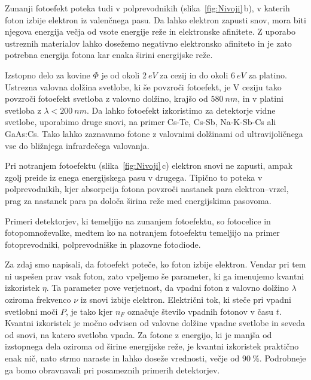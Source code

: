Zunanji fotoefekt poteka tudi v polprevodnikih (slika~\ref{fig:Nivoji}\,b),
v katerih foton izbije elektron iz valenčnega pasu. Da lahko elektron zapusti snov,
mora biti njegova energija večja od vsote energije reže in elektronske afinitete.
Z uporabo ustreznih materialov lahko dosežemo negativno elektronsko afiniteto
in je zato potrebna energija fotona kar enaka širini energijske reže.

Izstopno delo za kovine $\Phi$ je od okoli $2~\si{eV}$ za cezij in do okoli 
$6~\si{eV}$ za platino. 
Ustrezna valovna dolžina svetlobe, ki še povzroči fotoefekt, je 
V ceziju tako povzroči fotoefekt svetloba z valovno dolžino, krajšo od $580~\si{nm}$, in
v platini svetloba z $\lambda < 200~\si{nm}$. 
Da lahko fotoefekt izkoristimo za detektorje vidne svetlobe, 
uporabimo druge snovi, na primer Cs-Te, Cs-Sb, Na-K-Sb-Cs ali GaAs:Cs. 
Tako lahko zaznavamo fotone z valovnimi dolžinami od ultravijoličnega
vse do bližnjega infrardečega valovanja.

Pri notranjem fotoefektu (slika~\ref{fig:Nivoji}\,c) elektron 
snovi ne zapusti, ampak zgolj preide iz enega 
energijskega pasu v drugega. Tipično to poteka v polprevodnikih, kjer absorpcija fotona 
povzroči nastanek para elektron--vrzel, prag za nastanek para pa določa širina reže med 
energijskima pasovoma. 

Primeri detektorjev, ki temeljijo na zunanjem fotoefektu, so 
fotocelice in foto\-pomnoževalke, medtem ko na notranjem fotoefektu temeljijo na primer
fotoprevodniki, polprevodniške in plazovne fotodiode.

Za zdaj smo napisali, da fotoefekt poteče, ko foton izbije elektron. Vendar pri tem ni 
uspešen prav vsak foton, zato vpeljemo še parameter, ki ga imenujemo 
kvantni izkoristek $\eta$.
Ta parameter pove verjetnost, da vpadni foton z valovno dolžino $\lambda$ 
oziroma frekvenco $\nu$ iz snovi izbije elektron. 
Električni tok, ki steče pri vpadni svetlobni moči $P$, je tako
kjer $n_F$ označuje število vpadnih fotonov v času $t$. 
Kvantni izkoristek je močno odvisen od valovne dolžine vpadne svetlobe in seveda
od snovi, na katero svetloba vpada. Za fotone z energijo, ki je manjša od izstopnega 
dela oziroma od širine energijske reže, je kvantni izkoristek praktično enak nič, 
nato strmo naraste in lahko doseže vrednosti, večje od $90~\%$. Podrobneje ga bomo 
obravnavali pri posameznih primerih detektorjev.

